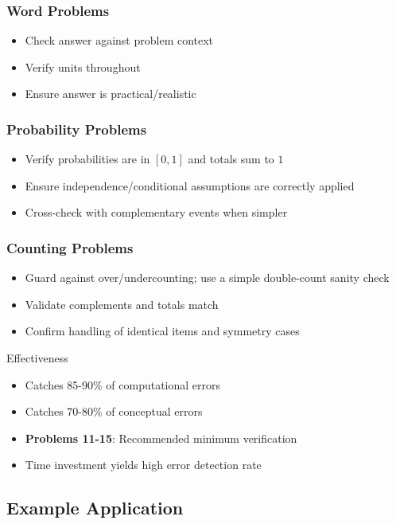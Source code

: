 \documentclass{article}
\newcommand{\problemrange}[1]{\textbf{Problems #1}}
\begin{document}
\subsubsection{Word Problems}
\begin{itemize}
\item Check answer against problem context
\item Verify units throughout
\item Ensure answer is practical/realistic
\end{itemize}

\subsubsection{Probability Problems}
\begin{itemize}
\item Verify probabilities are in $[0,1]$ and totals sum to $1$
\item Ensure independence/conditional assumptions are correctly applied
\item Cross-check with complementary events when simpler
\end{itemize}

\subsubsection{Counting Problems}
\begin{itemize}
\item Guard against over/undercounting; use a simple double-count sanity check
\item Validate complements and totals match
\item Confirm handling of identical items and symmetry cases
\end{itemize}

\begin{successbox}{Effectiveness}
\begin{itemize}[nosep]
\item Catches 85-90\% of computational errors
\item Catches 70-80\% of conceptual errors
\item \problemrange{11-15}: Recommended minimum verification
\item Time investment yields high error detection rate
\end{itemize}
\end{successbox}

\subsection{Example Application}
\end{document}
